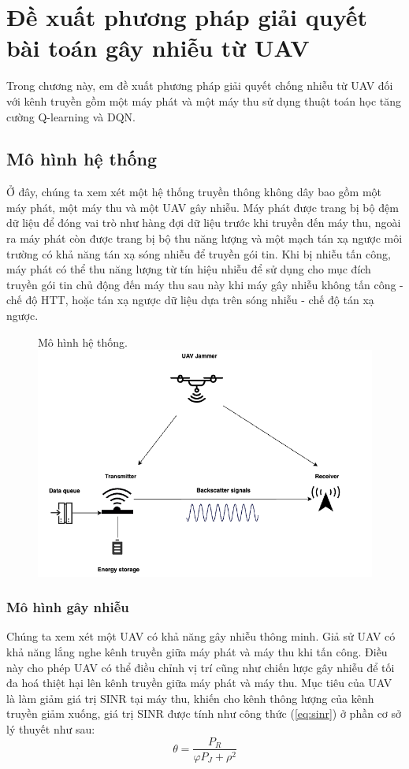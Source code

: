\documentclass{uetgraduation}
\begin{document}
\chapter{Đề xuất phương pháp giải quyết bài toán gây nhiễu từ UAV}
Trong chương này, em đề xuất phương pháp giải quyết chống nhiễu từ UAV đối với kênh truyền gồm một máy phát và một máy thu sử dụng thuật toán học tăng cường Q-learning và DQN.

\section{Mô hình hệ thống}
Ở đây, chúng ta xem xét một hệ thống truyền thông không dây bao gồm một máy phát, một máy thu và một UAV gây nhiễu. Máy phát được trang bị bộ đệm dữ liệu để đóng vai trò như hàng đợi dữ 
liệu trước khi truyền đến máy thu, ngoài ra máy phát còn được trang bị bộ thu năng lượng và một mạch tán xạ ngược môi trường có khả năng tán xạ sóng nhiễu để truyền gói tin. Khi bị nhiễu
tấn công, máy phát có thể thu năng lượng từ tín hiệu nhiễu để sử dụng cho mục đích truyền gói tin chủ
động đến máy thu sau này khi máy gây nhiễu không tấn công - chế độ HTT, hoặc tán xạ ngược dữ liệu dựa trên sóng nhiễu - chế độ tán xạ ngược.

\begin{figure}{Mô hình hệ thống.}
    \centering
    \includegraphics[scale=0.5]{system_model}
    \label{fig:system_model}
\end{figure}

\subsection{Mô hình gây nhiễu}
Chúng ta xem xét một UAV có khả năng gây nhiễu thông minh. Giả sử UAV có khả năng lắng nghe kênh truyền giữa máy phát và máy thu khi tấn công. Điều này cho phép UAV có thể điều chỉnh vị trí
cũng như chiến lược gây nhiễu để tối đa hoá thiệt hại lên kênh truyền giữa máy phát và máy thu. Mục tiêu của UAV là làm giảm giá trị SINR tại máy thu, khiến cho kênh thông lượng của kênh
truyền giảm xuống, giá trị SINR được tính như công thức (\ref{eq:sinr}) ở phần cơ sở lý thuyết như sau:
\begin{equation}
    \theta = \frac{P_R}{\varphi P_J + \rho^2}
\end{equation}
\end{document}

